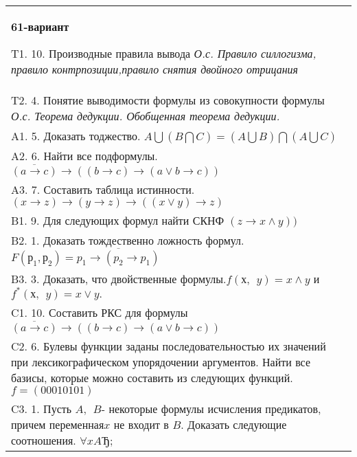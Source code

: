 \documentclass{article}
\begin{document}
\begin{tabular}{m{17cm}}
\textbf{61-вариант}
\newline

T1. 10. Производные правила вывода \emph{О.с. Правило силлогизма, правило контрпозиции,правило снятия двойного отрицания} \\
T2. 4. Понятие выводимости формулы из совокупности формулы \emph{О.с. Теорема дедукции. Обобщенная теорема дедукции.} \\
A1. 5. Доказать тоджество. \(A\bigcup(B\bigcap C) = (A\bigcup B)\bigcap(A\bigcup C)\) \\
A2. 6. Найти все подформулы. \(\overline{(a \rightarrow c)} \rightarrow \left( (b \rightarrow c) \rightarrow (a \vee b \rightarrow c) \right)\) \\
A3. 7. Составить таблица истинности. \((x \rightarrow z) \rightarrow (y \rightarrow z) \rightarrow ((x \vee y) \rightarrow z)\) \\
B1. 9. Для следующих формул найти СКНФ \((z \rightarrow x \land y))\) \\
B2. 1. Доказать тождественно ложность формул. \(F\left( р_{1},р_{2} \right) = \overline{p_{1} \rightarrow (p_{2} \rightarrow p_{1})}\) \\
B3. 3. Доказать, что двойственные формулы.\(f(х,\ \ y) = x \land y\) и \(f^{*}(х,\ \ y) = x \vee y.\) \\
C1. 10. Составить РКС для формулы \(\overline{(a \rightarrow c)} \rightarrow \left( (b \rightarrow c) \rightarrow (a \vee b \rightarrow c) \right)\) \\
C2. 6. Булевы функции заданы последовательностью их значений при лексикографическом упорядочении аргументов. Найти все базисы, которые можно составить из следующих функций. \(f = (00010101)\) \\
C3. 1. Пусть \(A,\ \ B\)- некоторые формулы исчисления предикатов, причем переменная\(x\) не входит в \(B\). Доказать следующие соотношения. \(\forall xAЂ\); \\

\end{tabular}
\vspace{1cm}
\end{document}
